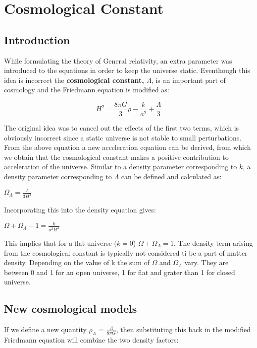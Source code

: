 \section{Cosmological Constant}
\subsection{Introduction}
While formulating the theory of General relativity, an extra parameter was introduced to the equations in order to keep the universe static. Eventhough this idea is incorrect the \textbf{cosmological constant, $\Lambda$}, is an important part of cosmology and the Friedmann equation is modified as:

\begin{equation}
    H^2 = \frac{8\pi{G}}{3}\rho - \frac{k}{a^2} + \frac{\Lambda}{3}
\end{equation}

The original idea was to cancel out the effects of the first two terms, which is obviously incorrect since a static universe is not stable to small perturbations. From the above equation a new acceleration equation can be derived, from which we obtain that the cosmological constant makes a positive contribution to acceleration of the universe. Similar to a density parameter corresponding to $k$, a density parameter corresponding to $\Lambda$ can be defined and calculated as:

\begin{center}
    $\Omega_{\Lambda} = \frac{\Lambda}{3H^2}$
\end{center}

Incorporating this into the density equation gives:

\begin{center}
    $\Omega+\Omega_{\Lambda}-1 = \frac{k}{a^2H^2}$
\end{center}

This implies that for a flat universe ($k=0$) \textbf{$\Omega+\Omega_{\Lambda}=1$}. The density term arising from the cosmological constant is typically not considered ti be a part of matter density. Depending on the value of k the sum of $\Omega$ and $\Omega_{\Lambda}$ vary. They are between 0 and 1 for an open universe, 1 for flat and grater than 1 for closed universe.

\subsection{New cosmological models}
If we define a new quantity \textbf{$\rho_{\Lambda}$} = $\frac{\Lambda}{8\pi{G}}$, then substituting this back in the modified Friedmann equation will combine the two density factors:

